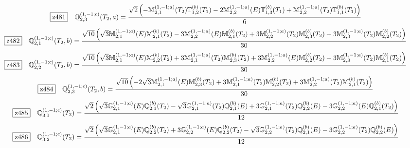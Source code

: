 \documentclass[fleqn,10pt,landscape]{jsarticle}
\begin{document}
\begin{dmath*}
\hspace*{3mm}\fbox{z481}\quad \mathbb{Q}_{2,3}^{(1,-1;c)}(T_{2},a)=\frac{\sqrt{2} \left(- \mathbb{M}_{2,1}^{(1,-1;a)}(T_{2}) \mathbb{T}_{1,2}^{(b)}(T_{1}) - 2 \mathbb{M}_{2,2}^{(1,-1;a)}(E) \mathbb{T}_{1,3}^{(b)}(T_{1}) + \mathbb{M}_{2,2}^{(1,-1;a)}(T_{2}) \mathbb{T}_{1,1}^{(b)}(T_{1})\right)}{6}
\end{dmath*}
\begin{dmath*}
\hspace*{3mm}\fbox{z482}\quad \mathbb{Q}_{2,1}^{(1,-1;c)}(T_{2},b)=\frac{\sqrt{10} \left(\sqrt{3} \mathbb{M}_{2,1}^{(1,-1;a)}(E) \mathbb{M}_{2,1}^{(b)}(T_{2}) - 3 \mathbb{M}_{2,2}^{(1,-1;a)}(E) \mathbb{M}_{2,1}^{(b)}(T_{2}) + 3 \mathbb{M}_{2,2}^{(1,-1;a)}(T_{2}) \mathbb{M}_{2,3}^{(b)}(T_{2}) + 3 \mathbb{M}_{2,3}^{(1,-1;a)}(T_{2}) \mathbb{M}_{2,2}^{(b)}(T_{2})\right)}{30}
\end{dmath*}
\begin{dmath*}
\hspace*{3mm}\fbox{z483}\quad \mathbb{Q}_{2,2}^{(1,-1;c)}(T_{2},b)=\frac{\sqrt{10} \left(\sqrt{3} \mathbb{M}_{2,1}^{(1,-1;a)}(E) \mathbb{M}_{2,2}^{(b)}(T_{2}) + 3 \mathbb{M}_{2,1}^{(1,-1;a)}(T_{2}) \mathbb{M}_{2,3}^{(b)}(T_{2}) + 3 \mathbb{M}_{2,2}^{(1,-1;a)}(E) \mathbb{M}_{2,2}^{(b)}(T_{2}) + 3 \mathbb{M}_{2,3}^{(1,-1;a)}(T_{2}) \mathbb{M}_{2,1}^{(b)}(T_{2})\right)}{30}
\end{dmath*}
\begin{dmath*}
\hspace*{3mm}\fbox{z484}\quad \mathbb{Q}_{2,3}^{(1,-1;c)}(T_{2},b)=\frac{\sqrt{10} \left(- 2 \sqrt{3} \mathbb{M}_{2,1}^{(1,-1;a)}(E) \mathbb{M}_{2,3}^{(b)}(T_{2}) + 3 \mathbb{M}_{2,1}^{(1,-1;a)}(T_{2}) \mathbb{M}_{2,2}^{(b)}(T_{2}) + 3 \mathbb{M}_{2,2}^{(1,-1;a)}(T_{2}) \mathbb{M}_{2,1}^{(b)}(T_{2})\right)}{30}
\end{dmath*}
\begin{dmath*}
\hspace*{3mm}\fbox{z485}\quad \mathbb{Q}_{3,1}^{(1,-1;c)}(T_{2})=\frac{\sqrt{2} \left(\sqrt{3} \mathbb{G}_{2,1}^{(1,-1;a)}(E) \mathbb{Q}_{2,1}^{(b)}(T_{2}) - \sqrt{3} \mathbb{G}_{2,1}^{(1,-1;a)}(T_{2}) \mathbb{Q}_{2,1}^{(b)}(E) + 3 \mathbb{G}_{2,1}^{(1,-1;a)}(T_{2}) \mathbb{Q}_{2,2}^{(b)}(E) - 3 \mathbb{G}_{2,2}^{(1,-1;a)}(E) \mathbb{Q}_{2,1}^{(b)}(T_{2})\right)}{12}
\end{dmath*}
\begin{dmath*}
\hspace*{3mm}\fbox{z486}\quad \mathbb{Q}_{3,2}^{(1,-1;c)}(T_{2})=\frac{\sqrt{2} \left(\sqrt{3} \mathbb{G}_{2,1}^{(1,-1;a)}(E) \mathbb{Q}_{2,2}^{(b)}(T_{2}) + 3 \mathbb{G}_{2,2}^{(1,-1;a)}(E) \mathbb{Q}_{2,2}^{(b)}(T_{2}) - \sqrt{3} \mathbb{G}_{2,2}^{(1,-1;a)}(T_{2}) \mathbb{Q}_{2,1}^{(b)}(E) - 3 \mathbb{G}_{2,2}^{(1,-1;a)}(T_{2}) \mathbb{Q}_{2,2}^{(b)}(E)\right)}{12}
\end{dmath*}
\end{document}
